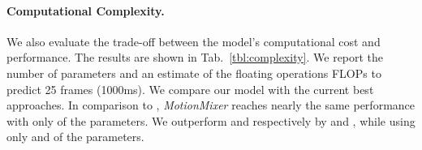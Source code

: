 \documentclass{article}
\begin{document}
\begin{table}[htp!]
\centering
{}
\caption{Influence of different parts of the \textit{STMixer} on the performance. ”SE-Block” denotes the squeeze-and-excitation blocks. The best results are shown in bold.}
\label{tab:ablation_stmixer}
\end{table}


\paragraph{Computational Complexity.} We also evaluate the trade-off between the model’s computational cost and performance. The results are shown in Tab.~\ref{tbl:complexity}. We report the number of parameters and an estimate of the floating operations FLOPs to predict 25 frames (1000ms). We compare our model with the current best approaches. In comparison to \cite{mao2021multi}, \textit{MotionMixer} reaches nearly the same performance with only  of the parameters. We outperform \cite{sofianos2021space} and \cite{dang2021msr} respectively by  and , while using only  and  of the parameters.  
\end{document}
